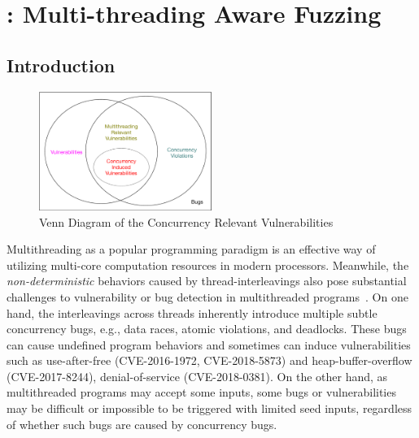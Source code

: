 
\chapter{\mtfuzz: Multi-threading Aware Fuzzing} \label{ch:mtfuzz}

\section{Introduction}\label{sec:mtfuzz_intro}

\begin{figure}
\begin{center}
	\includegraphics[width=0.5\textwidth]{res/venn}
	\caption{Venn Diagram of the Concurrency Relevant Vulnerabilities}
	\label{fig:venn_con_vul}
\end{center}	
\end{figure}

Multithreading as a popular programming paradigm is an effective way of utilizing multi-core computation resources in modern processors. Meanwhile, the \emph{non-deterministic} behaviors caused by thread-interleavings also pose substantial challenges to vulnerability or bug detection in multithreaded programs~\cite{mtbugs_survey}. On one hand, the interleavings across threads inherently introduce multiple subtle concurrency bugs, e.g., data races, atomic violations, and deadlocks. These bugs can cause undefined program behaviors and sometimes can induce vulnerabilities such as use-after-free (CVE-2016-1972, CVE-2018-5873) and heap-buffer-overflow (CVE-2017-8244), denial-of-service (CVE-2018-0381). On the other hand, as multithreaded programs may accept some inputs, some bugs or vulnerabilities may be difficult or impossible to be triggered with limited seed inputs, regardless of whether such bugs are caused by concurrency bugs. 



